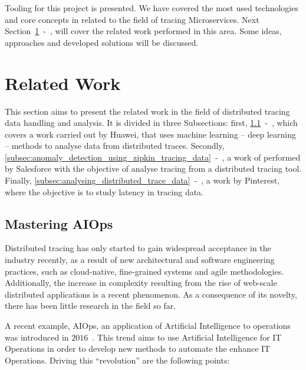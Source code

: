 Tooling for this project is presented. We have covered the most used technologies and core concepts in related to the field of tracing Microservices. Next Section~\ref{sec:related_work}~-~, will cover the related work performed in this area. Some ideas, approaches and developed solutions will be discussed.

\section{Related Work}
\label{sec:related_work}

This section aims to present the related work in the field of distributed tracing data handling and analysis. It is divided in three Subsections: first, \ref{subsec:mastering_aiops}~-~, which covers a work carried out by Huawei, that uses machine learning -- deep learning -- methods to analyse data from distributed traces. Secondly, \ref{subsec:anomaly_detection_using_zipkin_tracing_data}~-~, a work of performed by Salesforce with the objective of analyse tracing from a distributed tracing tool. Finally, \ref{subsec:analysing_distributed_trace_data}~-~, a work by Pinterest, where the objective is to study latency in tracing data.

\subsection{Mastering AIOps}
\label{subsec:mastering_aiops}

Distributed tracing has only started to gain widespread acceptance in the industry recently, as a result of new architectural and software engineering practices, such as cloud-native, fine-grained systems and agile methodologies. Additionally, the increase in complexity resulting from the rise of web-scale distributed applications is a recent phenomenon. As a consequence of its novelty, there has been little research in the field so far.

A recent example, AIOps, an application of Artificial Intelligence to operations~\cite{rising_aiops} was introduced in $2016$~\cite{gartner_aiops}. This trend aims to use Artificial Intelligence for IT Operations in order to develop new methods to automate the enhance IT Operations. Driving this ``revolution'' are the following points:

